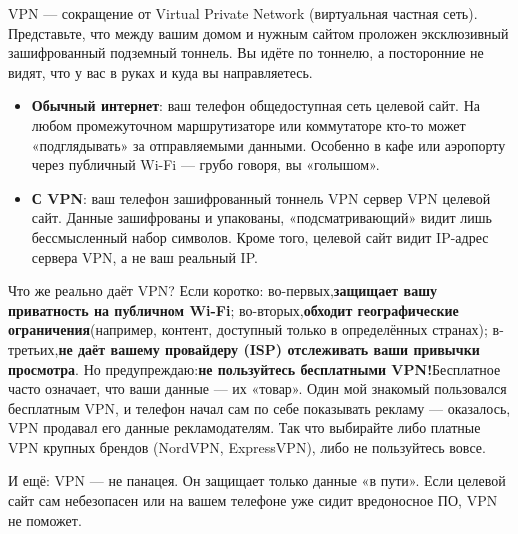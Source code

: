 


VPN — сокращение от Virtual Private Network (виртуальная частная сеть). Представьте, что между вашим домом и нужным сайтом проложен эксклюзивный зашифрованный подземный тоннель. Вы идёте по тоннелю, а посторонние не видят, что у вас в руках и куда вы направляетесь.

\begin{itemize}
  \item \textbf{Обычный интернет}: ваш телефон общедоступная сеть целевой сайт. На любом промежуточном маршрутизаторе или коммутаторе кто-то может «подглядывать» за отправляемыми данными. Особенно в кафе или аэропорту через публичный Wi-Fi — грубо говоря, вы «голышом».
  \item \textbf{С VPN}: ваш телефон зашифрованный тоннель VPN сервер VPN целевой сайт. Данные зашифрованы и упакованы, «подсматривающий» видит лишь бессмысленный набор символов. Кроме того, целевой сайт видит IP-адрес сервера VPN, а не ваш реальный IP.
\end{itemize}

Что же реально даёт VPN? Если коротко: во-первых,\textbf{защищает вашу приватность на публичном Wi-Fi}; во-вторых,\textbf{обходит географические ограничения}(например, контент, доступный только в определённых странах); в-третьих,\textbf{не даёт вашему провайдеру (ISP) отслеживать ваши привычки просмотра}. Но предупреждаю:\textbf{не пользуйтесь бесплатными VPN!}Бесплатное часто означает, что ваши данные — их «товар». Один мой знакомый пользовался бесплатным VPN, и телефон начал сам по себе показывать рекламу — оказалось, VPN продавал его данные рекламодателям. Так что выбирайте либо платные VPN крупных брендов (NordVPN, ExpressVPN), либо не пользуйтесь вовсе.

И ещё: VPN — не панацея. Он защищает только данные «в пути». Если целевой сайт сам небезопасен или на вашем телефоне уже сидит вредоносное ПО, VPN не поможет.

